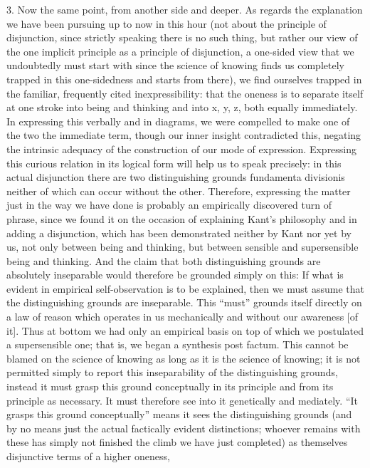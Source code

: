 3. Now the same point, from another side and deeper.
As regards the explanation we have been
pursuing up to now in this hour
(not about the principle of disjunction,
since strictly speaking there is no such thing,
but rather our view of the one implicit principle
as a principle of disjunction,
a one-sided view that we undoubtedly must start with
since the science of knowing finds us completely trapped
in this one-sidedness and starts from there),
we find ourselves trapped in the familiar,
frequently cited inexpressibility:
that the oneness is to separate itself
at one stroke into being and thinking
and into x, y, z, both equally immediately.
In expressing this verbally and in diagrams,
we were compelled to make one of the two the immediate term,
though our inner insight contradicted this,
negating the intrinsic adequacy of
the construction of our mode of expression.
Expressing this curious relation in
its logical form will help us to speak precisely:
in this actual disjunction there are
two distinguishing grounds {fundamenta divisionis}
neither of which can occur without the other.
Therefore, expressing the matter just in the way
we have done is probably an empirically discovered turn of phrase,
since we found it on the occasion of explaining Kant's philosophy
and in adding a disjunction,
which has been demonstrated
neither by Kant nor yet by us,
not only between being and thinking,
but between sensible and supersensible being and thinking.
And the claim that both distinguishing grounds are
absolutely inseparable would therefore be grounded simply on this:
If what is evident in empirical self-observation is to be explained,
then we must assume that the distinguishing grounds are inseparable.
This “must” grounds itself directly
on a law of reason which operates in us mechanically
and without our awareness [of it].
Thus at bottom we had only an empirical basis
on top of which we postulated a supersensible one;
that is, we began a synthesis post factum.
This cannot be blamed on the science of knowing as
long as it is the science of knowing;
it is not permitted simply to report this
inseparability of the distinguishing grounds,
instead it must grasp this ground conceptually
in its principle and from its principle as necessary.
It must therefore see into it genetically and mediately.
“It grasps this ground conceptually”
means it sees the distinguishing grounds
(and by no means just the actual
factically evident distinctions;
whoever remains with these has simply not
finished the climb we have just completed)
as themselves disjunctive terms of a higher oneness,
